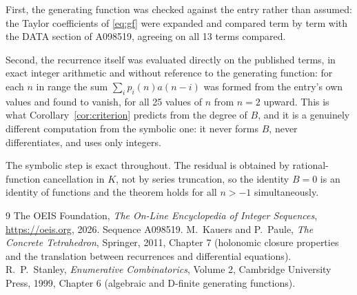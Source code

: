 \documentclass[11pt,a4paper]{article}
\theoremstyle{plain}
\theoremstyle{definition}
\begin{document}
First, the generating function was checked against the entry rather than assumed: the
Taylor coefficients of \eqref{eq:gf} were expanded and compared term by term with the DATA
section of A098519, agreeing on all 13 terms compared.

Second, the recurrence itself was evaluated directly on the published terms, in exact
integer arithmetic and without reference to the generating function: for each $n$ in range
the sum $\sum_{i}p_{i}(n)a(n-i)$ was formed from the entry's own values and found to
vanish, for all 25 values of $n$ from $n=2$ upward. This is what
Corollary~\ref{cor:criterion} predicts from the degree of $B$, and it is a genuinely
different computation from the symbolic one: it never forms $B$, never differentiates, and
uses only integers.

The symbolic step is exact throughout. The residual is obtained by rational-function
cancellation in $K$, not by series truncation, so the identity $B=0$ is an
identity of functions and the theorem holds for all $n>-1$ simultaneously.

\begin{thebibliography}{9}
 The OEIS Foundation, \emph{The On-Line Encyclopedia of Integer Sequences},
\url{https://oeis.org}, 2026. Sequence A098519.
 M.~Kauers and P.~Paule, \emph{The Concrete Tetrahedron}, Springer, 2011,
Chapter 7 (holonomic closure properties and the translation between recurrences and
differential equations).
 R.~P.~Stanley, \emph{Enumerative Combinatorics}, Volume 2, Cambridge
University Press, 1999, Chapter 6 (algebraic and D-finite generating functions).
\end{thebibliography}
\end{document}
